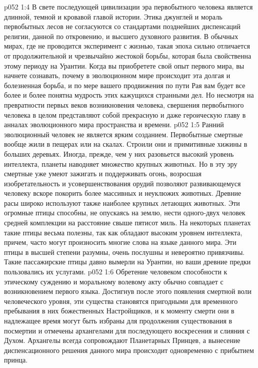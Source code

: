 \vs p052 1:4 В свете последующей цивилизации эра первобытного человека является длинной, темной и кровавой главой истории. Этика джунглей и мораль первобытных лесов не согласуются со стандартами позднейших диспенсаций религии, данной по откровению, и высшего духовного развития. В обычных мирах, где не проводится эксперимент с жизнью, такая эпоха сильно отличается от продолжительной и чрезвычайно жестокой борьбы, которая была свойственна этому периоду на Урантии. Когда вы приобретете свой опыт первого мира, вы начнете сознавать, почему в эволюционном мире происходит эта долгая и болезненная борьба, и по мере вашего продвижения по пути Рая вам будет все более и более понятна мудрость этих кажущихся странными дел. Но несмотря на превратности первых веков возникновения человека, свершения первобытного человека в целом представляют собой прекрасную и даже героическую главу в анналах эволюционного мира пространства и времени.
\vs p052 1:5 \pc Ранний эволюционный человек не является ярким созданием. Первобытные смертные вообще жили в пещерах или на скалах. Строили они и примитивные хижины в больших деревьях. Иногда, прежде, чем у них разовьется высокий уровень интеллекта, планеты наводняет множество крупных животных. Но в эту эру смертные уже умеют зажигать и поддерживать огонь, возросшая изобретательность и усовершенствования орудий позволяют развивающемуся человеку вскоре покорить более массивных и неуклюжих животных. Древние расы широко используют также наиболее крупных летающих животных. Эти огромные птицы способны, не опускаясь на землю, нести одного\hyp{}двух человек средней комплекции на расстояние свыше пятисот миль. На некоторых планетах такие птицы весьма полезны, так как обладают высоким уровнем интеллекта, причем, часто могут произносить многие слова на языке данного мира. Эти птицы в высшей степени разумны, очень послушны и невероятно привязчивы. Такие пассажирские птицы давно вымерли на Урантии, но ваши древние предки пользовались их услугами.
\vs p052 1:6 \pc Обретение человеком способности к этическому суждению и моральному волевому акту обычно совпадает с возникновением первого языка. Достигнув после этого появления смертной воли человеческого уровня, эти существа становятся пригодными для временного пребывания в них божественных Настройщиков, и к моменту смерти они в надлежащее время могут быть избраны для продолжения существования в посмертии и отмечены архангелами для последующего воскресения и слияния с Духом. Архангелы всегда сопровождают Планетарных Принцев, а вынесение диспенсационного решения данного мира происходит одновременно с прибытием принца.
